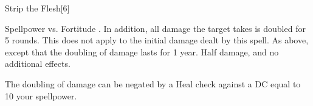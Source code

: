 \begin{spellsection}{Strip the Flesh}[6]
    \begin{spellheader}
    \end{spellheader}
    \begin{spellcontent}
        \begin{spelltargetinginfo}
        \end{spelltargetinginfo}
        \begin{spelleffects}
            \begin{spellattack}{Spellpower vs. Fortitude}
                \spellsuccess {}. In addition, all damage the target takes is doubled for 5 rounds. This does not apply to the initial damage dealt by this spell.
                \spellcritical As above, except that the doubling of damage lasts for 1 year.
                \spellfailure Half damage, and no additional effects.
            \end{spellattack}
        \end{spelleffects}
    \end{spellcontent}
    \begin{spellfooter}
        \spellnotes The doubling of damage can be negated by a Heal check against a DC equal to 10 \add your spellpower.

        \physicalspellnotes
        \miscastrandom
    \end{spellfooter}
\end{spellsection}

